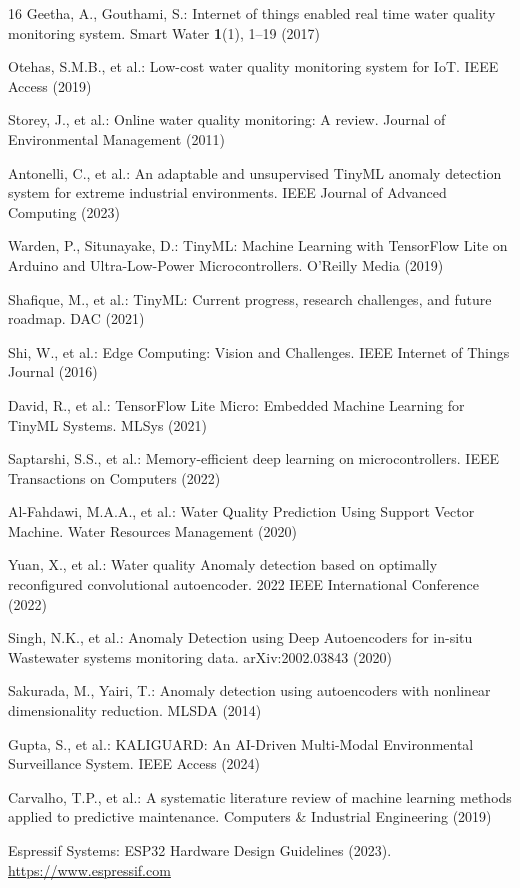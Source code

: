 \documentclass[runningheads]{llncs}
\begin{document}
\begin{thebibliography}{16}
Geetha, A., Gouthami, S.: Internet of things enabled real time water quality monitoring system. Smart Water \textbf{1}(1), 1--19 (2017)

Otehas, S.M.B., et al.: Low-cost water quality monitoring system for IoT. IEEE Access (2019)

Storey, J., et al.: Online water quality monitoring: A review. Journal of Environmental Management (2011)

Antonelli, C., et al.: An adaptable and unsupervised TinyML anomaly detection system for extreme industrial environments. IEEE Journal of Advanced Computing (2023)

Warden, P., Situnayake, D.: TinyML: Machine Learning with TensorFlow Lite on Arduino and Ultra-Low-Power Microcontrollers. O'Reilly Media (2019)

Shafique, M., et al.: TinyML: Current progress, research challenges, and future roadmap. DAC (2021)

Shi, W., et al.: Edge Computing: Vision and Challenges. IEEE Internet of Things Journal (2016)

David, R., et al.: TensorFlow Lite Micro: Embedded Machine Learning for TinyML Systems. MLSys (2021)

Saptarshi, S.S., et al.: Memory-efficient deep learning on microcontrollers. IEEE Transactions on Computers (2022)

Al-Fahdawi, M.A.A., et al.: Water Quality Prediction Using Support Vector Machine. Water Resources Management (2020)

Yuan, X., et al.: Water quality Anomaly detection based on optimally reconfigured convolutional autoencoder. 2022 IEEE International Conference (2022)

Singh, N.K., et al.: Anomaly Detection using Deep Autoencoders for in-situ Wastewater systems monitoring data. arXiv:2002.03843 (2020)

Sakurada, M., Yairi, T.: Anomaly detection using autoencoders with nonlinear dimensionality reduction. MLSDA (2014)

Gupta, S., et al.: KALIGUARD: An AI-Driven Multi-Modal Environmental Surveillance System. IEEE Access (2024)

Carvalho, T.P., et al.: A systematic literature review of machine learning methods applied to predictive maintenance. Computers \& Industrial Engineering (2019)

Espressif Systems: ESP32 Hardware Design Guidelines (2023). \url{https://www.espressif.com}
\end{thebibliography}
\end{document}
